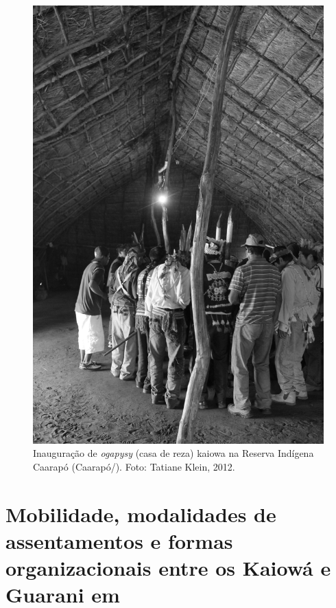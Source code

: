 \movetoevenpage
\begin{vplace}
\begin{figure}[H]
  \centering
 \includegraphics[width=\textwidth]{./img/GUARANIS-img6.jpg}	
  \hfill
  \caption{Inauguração de \emph{ogapysy} (casa de reza) kaiowa na Reserva Indígena
Caarapó (Caarapó/). Foto: Tatiane Klein, 2012.}
\end{figure}
\end{vplace}

\chapter{Mobilidade, modalidades de assentamentos e formas organizacionais entre
os Kaiowá e Guarani em }
\@openrighttrue\makeatother


